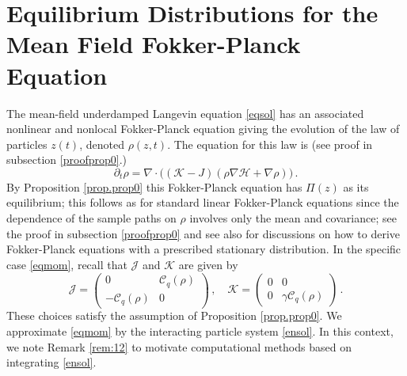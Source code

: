 \documentclass[12pt]{caltech_thesis}
\newtheorem{remark}[theorem]{Remark}
\numberwithin{equation}{section}
\begin{document}
\section{{Equilibrium Distributions for the Mean Field Fokker-Planck Equation}}
\label{3}
{The mean-field underdamped Langevin equation \eqref{eqsol} has an associated 
nonlinear and nonlocal Fokker-Planck equation giving the evolution of the law of particles
$z(t)$, denoted $\rho(z,t)$. The equation for this law is
{(see proof in subsection \ref{proofprop0}.)}
\begin{equation}
\label{fp}
\partial_t \rho=\nabla \cdot \bigl((\mathcal{K}-J)(\rho\nabla {\mathcal{H}}+\nabla\rho)\bigr)\,.
\end{equation}
{By Proposition \ref{prop.prop0} this Fokker-Planck equation has $\Pi(z)$ as its equilibrium; this follows as for standard linear Fokker-Planck equations \cite{pavliotis2014stochastic} since the dependence of the sample paths on $\rho$ involves only the mean and covariance; see the proof in subsection \ref{proofprop0}
and see also \cite{duncan2017using, graham1977covariant,jiang2004mathematical,risken1996fokker,pavliotis2014stochastic} for discussions on how to derive Fokker-Planck equations with a prescribed stationary distribution. 
In the specific case \eqref{eqmom}, recall that $\mathcal{J}$ and $\mathcal{K}$ are 
given by}}
\begin{equation} 
\mathcal{J}=\begin{pmatrix}
0 & \mathcal{C}_q(\rho) \\
-\mathcal{C}_q(\rho) & 0
\end{pmatrix}\,,\quad
\mathcal{K}=\begin{pmatrix}
0 & 0 \\
0 & {\gamma}\mathcal{C}_q(\rho)
\end{pmatrix}\,.
\end{equation}
{These choices satisfy the assumption of Proposition \ref{prop.prop0}.
We approximate \eqref{eqmom} by the interacting particle system \eqref{ensol}.
In this context, we note Remark \ref{rem:12} to motivate computational methods
based on integrating \eqref{ensol}.}






\end{document}
